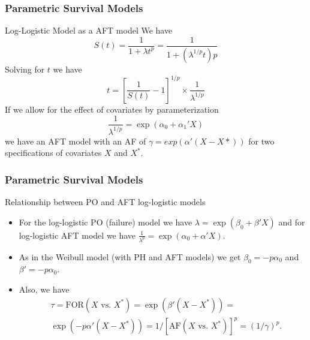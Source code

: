 \documentclass{beamer}
\theoremstyle{definition}
\begin{document}
\begin{frame}
\frametitle{Parametric Survival Models}
\begin{block}{Log-Logistic Model as a AFT model}
We have
\[
S(t) = \frac{1}{1 + \lambda t^p} = \frac{1}{1 + \left(\lambda^{1/p}t\right)p}
\]
Solving for $t$ we have
\[
t = \left[\frac{1}{S(t)} - 1 \right]^{1/p} \times \frac{1}{\lambda^{1/p}}
\]
If we allow for the effect of covariates by parameterization
\[
\frac{1}{\lambda^{1/p}} = \exp(\alpha_0 + \alpha_1' X)
\]
we have an AFT model with an AF of $\gamma=exp(\alpha'(X-X*))$ for two specifications of covariates $X$ and $X^*$.
\end{block}
\end{frame}

\begin{frame}
\frametitle{Parametric Survival Models}
\begin{block}{Relationship between PO and AFT log-logistic models}
\begin{itemize}
\item For the log-logistic PO (failure) model we have $\lambda = \exp(\beta_0 + \beta'X)$ and for log-logistic AFT model we have $\frac{1}{\lambda^p} = \exp(\alpha_0 + \alpha'X)$.
\item As in the Weibull model (with PH and AFT models) we get  $\beta_0 = -p \alpha_0$ and $\beta' = -p \alpha_0$.
\item Also, we have
\begin{align*}
& \tau = \text{FOR}(X \text{ vs. } X^*) = \exp(\beta'(X - X^*)) =\\
&\exp(-p\alpha'(X - X^*)) = 1/[\text{AF}(X \text{ vs. } X^*)]^p = (1/\gamma)^p.
\end{align*}
\end{itemize}
\end{block}
\end{frame}
\end{document}
